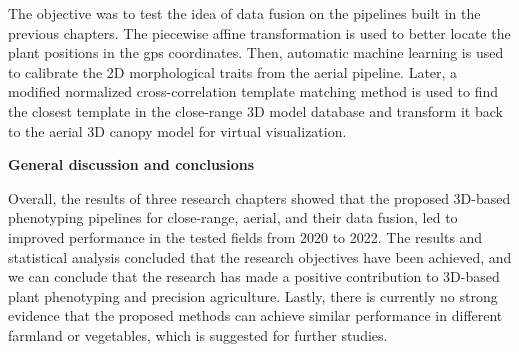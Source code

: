 \begin{doublespace}
The objective was to test the idea of data fusion on the pipelines built in the previous chapters. The piecewise affine transformation is used to better locate the plant positions in the \gls{gps} coordinates. Then, automatic machine learning is used to calibrate the 2D morphological traits from the aerial pipeline. Later, a modified normalized cross-correlation template matching method is used to find the closest template in the close-range 3D model database and transform it back to the aerial 3D canopy model for virtual visualization.


\vspace{5mm}
\noindent
\textbf{General discussion and conclusions}


Overall, the results of three research chapters showed that the proposed 3D-based phenotyping pipelines for close-range, aerial, and their data fusion, led to improved performance in the tested fields from 2020 to 2022. The results and statistical analysis concluded that the research objectives have been achieved, and we can conclude that the research has made a positive contribution to 3D-based plant phenotyping and precision agriculture. Lastly, there is currently no strong evidence that the proposed methods can achieve similar performance in different farmland or vegetables, which is suggested for further studies.

\end{doublespace}
  

